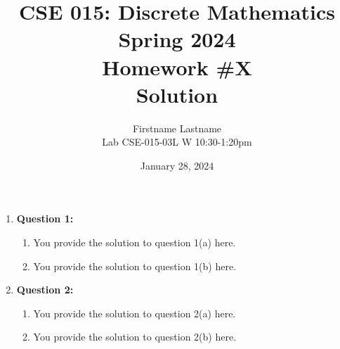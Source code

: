 \documentclass[11pt]{article}
\begin{document}
\author{Firstname Lastname\\
Lab CSE-015-03L W 10:30-1:20pm}
\title{CSE 015: Discrete Mathematics\\
Spring 2024\\
Homework \#X\\
Solution}
\date{January 28, 2024}
\maketitle
\begin{enumerate}
\item
\textbf{Question 1:}
\begin{enumerate}[label=(\alph*)]
\item
You provide the solution to question 1(a) here.
\item
You provide the solution to question 1(b) here.
\end{enumerate}
\item
\textbf{Question 2:}
\begin{enumerate}[label=(\alph*)]
\item
You provide the solution to question 2(a) here.
\item
You provide the solution to question 2(b) here.
\end{enumerate}
\end{enumerate}
\end{document}
